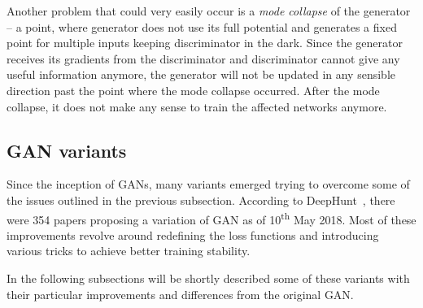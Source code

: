 Another problem that could very easily occur is a {\em mode collapse} of the generator -- a point, where generator does not use its full potential and generates a fixed point for multiple inputs keeping discriminator in the dark. Since the generator receives its gradients from the discriminator and discriminator cannot give any useful information anymore, the generator will not be updated in any sensible direction past the point where the mode collapse occurred. After the mode collapse, it does not make any sense to train the affected networks anymore.

\subsection{GAN variants}

Since the inception of GANs, many variants emerged trying to overcome some of the issues outlined in the previous subsection. According to DeepHunt~\cite{deephunt}, there were 354 papers proposing a variation of GAN as of 10\textsuperscript{th} May 2018. Most of these improvements revolve around redefining the loss functions and introducing various tricks to achieve better training stability.

In the following subsections will be shortly described some of these variants with their particular improvements and differences from the original GAN.

